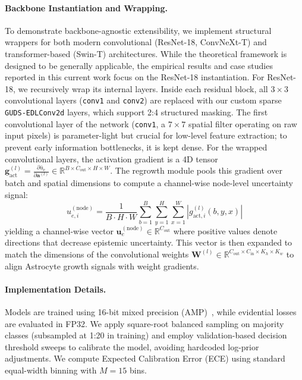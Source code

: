 \documentclass[letterpaper]{article} %
\newcommand{\R}{\mathbb{R}}
\begin{document}
\paragraph{Backbone Instantiation and Wrapping.}
To demonstrate backbone-agnostic extensibility, we implement structural wrappers for both modern convolutional (ResNet-18, ConvNeXt-T) and transformer-based (Swin-T) architectures. While the theoretical framework is designed to be generally applicable, the empirical results and case studies reported in this current work focus on the ResNet-18 instantiation.
For ResNet-18, we recursively wrap its internal layers. Inside each residual block, all $3 \times 3$ convolutional layers (\texttt{conv1} and \texttt{conv2}) are replaced with our custom sparse \texttt{GUDS-EDLConv2d} layers, which support 2:4 structured masking. The first convolutional layer of the network (\texttt{conv1}, a $7 \times 7$ spatial filter operating on raw input pixels) is parameter-light but crucial for low-level feature extraction; to prevent early information bottlenecks, it is kept dense. For the wrapped convolutional layers, the activation gradient is a 4D tensor $\bm{g}_{\text{act}}^{(l)} = \frac{\partial \bar{u}_e}{\partial \bm{a}^{(l)}} \in \R^{B \times C_{\text{out}} \times H \times W}$. The regrowth module pools this gradient over batch and spatial dimensions to compute a channel-wise node-level uncertainty signal:
\begin{equation}\label{eq:conv_pooling_main}
    u_{e,i}^{(\text{node})} = \frac{1}{B \cdot H \cdot W} \sum_{b=1}^B \sum_{y=1}^H \sum_{x=1}^W \left| g_{\text{act}, i}^{(l)}(b, y, x) \right|
\end{equation}
yielding a channel-wise vector $\bm{u}_e^{(\text{node})} \in \R^{C_{\text{out}}}$ where positive values denote directions that decrease epistemic uncertainty. This vector is then expanded to match the dimensions of the convolutional weights $\bm{W}^{(l)} \in \R^{C_{\text{out}} \times C_{\text{in}} \times K_h \times K_w}$ to align Astrocyte growth signals with weight gradients.

\paragraph{Implementation Details.} Models are trained using 16-bit mixed precision (AMP)~\cite{micikevicius2018mixed}, while evidential losses are evaluated in FP32. We apply square-root balanced sampling on majority classes (subsampled at 1:20 in training) and employ validation-based decision threshold sweeps to calibrate the model, avoiding hardcoded log-prior adjustments. We compute Expected Calibration Error (ECE) using standard equal-width binning with $M=15$ bins.
\end{document}
